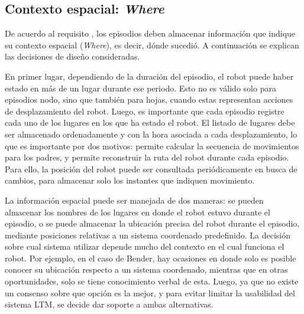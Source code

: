 \subsection{Contexto espacial: \textit{Where}}\label{sec:design_ep_where}

De acuerdo al requisito , los episodios deben almacenar información que indique su contexto espacial (\textit{Where}), es decir, dónde sucedió. A continuación se explican las decisiones de diseño consideradas.

En primer lugar, dependiendo de la duración del episodio, el robot puede haber estado en más de un lugar durante ese periodo. Esto no es válido solo para episodios nodo, sino que también para hojas, cuando estas representan acciones de desplazamiento del robot. Luego, es importante que cada episodio registre cada uno de los lugares en los que ha estado el robot. El listado de lugares debe ser almacenado ordenadamente y con la hora asociada a cada desplazamiento, lo que es importante por dos motivos: permite calcular la secuencia de movimientos para los padres, y permite reconstruir la ruta del robot durante cada episodio. Para ello, la posición del robot puede ser consultada periódicamente en busca de cambios, para almacenar solo los instantes que indiquen movimiento. 

La información espacial puede ser manejada de dos maneras: se pueden almacenar los nombres de los lugares en donde el robot estuvo durante el episodio, o se puede almacenar la ubicación precisa del robot durante el episodio, mediante posiciones relativas a un sistema coordenado predefinido. La decisión sobre cual sistema utilizar depende mucho del contexto en el cual funciona el robot. Por ejemplo, en el caso de Bender, hay ocasiones en donde solo es posible conocer su ubicación respecto a un sistema coordenado, mientras que en otras oportunidades, solo se tiene conocimiento verbal de esta. Luego, ya que no existe un consenso sobre que opción es la mejor, y para evitar limitar la usabilidad del sistema LTM, se decide dar soporte a ambas alternativas.



